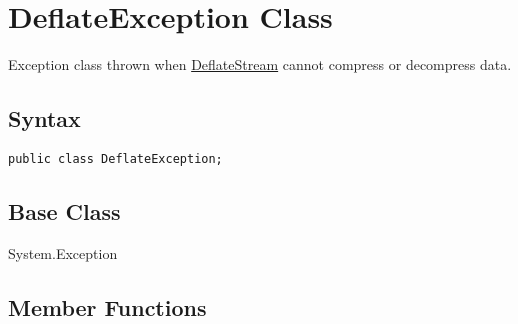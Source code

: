 \documentclass[a4paper,oneside,11.000000pt]{book}
\begin{document}
\hypertarget{System.IO.Compression.DeflateException}{\section{DeflateException Class}}
\begin{flushleft}
Exception class thrown when \hyperlink{System.IO.Compression.DeflateStream}{DeflateStream} cannot compress or decompress data.

\end{flushleft}
\subsection*{Syntax}\texttt{public class DeflateException;}

\subsection*{Base Class}System.Exception\subsection{Member Functions}
\end{document}
